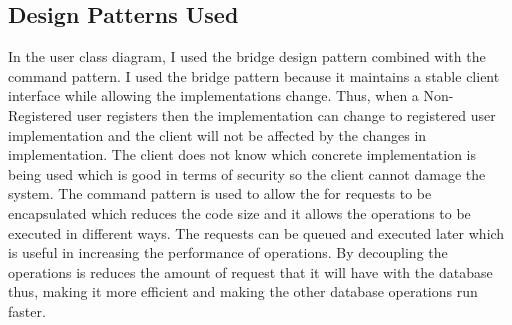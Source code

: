\subsection{Design Patterns Used}
		In the user class diagram, I used the bridge design pattern combined with the command pattern. I used the bridge pattern because it maintains a stable client interface while allowing the implementations change. Thus, when a Non-Registered user registers then the implementation can change to registered user implementation and the client will not be affected by the changes in implementation. The client does not know which concrete implementation is being used which is good in terms of security so the client cannot damage the system. The command pattern is used to allow the for requests to be encapsulated which reduces the code size and it allows the operations to be executed in different ways. The requests can be queued and executed later which is useful in increasing the performance of operations. By decoupling the operations is reduces the amount of request that it will have with the database thus, making it more efficient and making the other database operations run faster.
		

